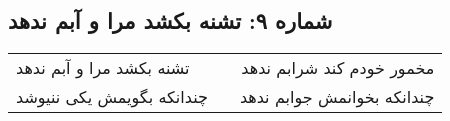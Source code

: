 \begin{center}
\section*{شماره ۹: تشنه بکشد مرا و آبم ندهد}
\label{sec:009}
\begin{longtable}{l p{0.5cm} r}
تشنه بکشد مرا و آبم ندهد
&&
مخمور خودم کند شرابم ندهد
\\
چندانکه بگویمش یکی ننیوشد
&&
چندانکه بخوانمش جوابم ندهد
\\
\end{longtable}
\end{center}
